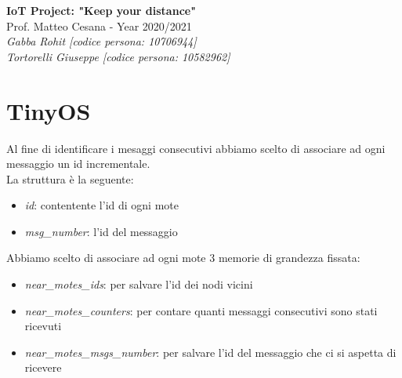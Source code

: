 \documentclass{article}
\begin{document}
\begin{titlepage}
   \begin{center}
      \Huge\textbf{IoT Project: "Keep your distance"}\\
      \vspace{5mm} %
      \Large Prof. Matteo Cesana - Year 2020/2021\\
      \vspace{5mm} %
      \large\textit{Gabba Rohit [codice persona: 10706944]}
      \\
      \large\textit{Tortorelli Giuseppe [codice persona: 10582962]}
   \end{center}
\end{titlepage}
\printindex

\section{TinyOS}
Al fine di identificare i mesaggi consecutivi abbiamo scelto di 
associare ad ogni messaggio un id incrementale. \\
La struttura è la seguente:

\begin{itemize}
   \item \textit{id}: contentente l'id di ogni mote
   \item \textit{msg\_number}: l'id del messaggio
\end{itemize}

Abbiamo scelto di associare ad ogni mote 3 memorie di grandezza fissata:

\begin{itemize}
   \item \textit{near\_motes\_ids}: per salvare l'id dei nodi vicini 
   \item \textit{near\_motes\_counters}: per contare quanti messaggi consecutivi sono stati ricevuti 
   \item \textit{near\_motes\_msgs\_number}: per salvare l'id del messaggio che ci si aspetta di ricevere
\end{itemize}
\end{document}
